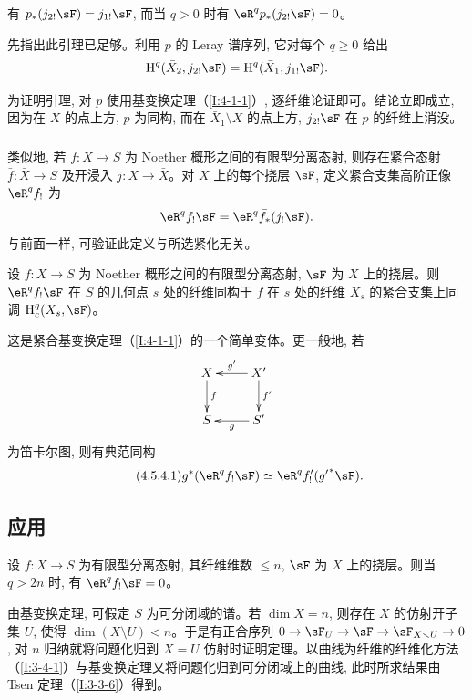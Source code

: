 \begin{lemma}\label{I:4-5-2}
有 $p_*(j_{2!}\sF)=j_{1!}\sF$, 而当 $q>0$ 时有 $\eR^qp_*(j_{2!}\sF)=0$。
\end{lemma}

先指出此引理已足够。利用 $p$ 的 Leray 谱序列, 它对每个 $q\geqslant0$ 给出
\[
  \h^q(\bar X_2, j_{2!} \sF) = \h^q(\bar X_1, j_{1!} \sF) \text{.}
\]

为证明引理, 对 $p$ 使用基变换定理（\ref{I:4-1-1}）, 逐纤维论证即可。结论立即成立, 因为在 $X$ 的点上方, $p$ 为同构, 而在 $\bar X_1\setminus X$ 的点上方, $j_{2!}\sF$ 在 $p$ 的纤维上消没。

\subsubsection{}\label{I:4-5-3}

类似地, 若 $f:X\to S$ 为 Noether 概形之间的有限型分离态射, 则存在紧合态射 $\bar f:\bar X\to S$ 及开浸入 $j:X\to\bar X$。对 $X$ 上的每个挠层 $\sF$, 定义紧合支集高阶正像 $\eR^qf_!$ 为
\[
  \eR^q f_! \sF = \eR^q \bar f_*(j_! \sF) \text{.}
\]
与前面一样, 可验证此定义与所选紧化无关。

\begin{theorem}\label{I:4-5-4}
设 $f:X\to S$ 为 Noether 概形之间的有限型分离态射, $\sF$ 为 $X$ 上的挠层。则 $\eR^qf_!\sF$ 在 $S$ 的几何点 $s$ 处的纤维同构于 $f$ 在 $s$ 处的纤维 $X_s$ 的紧合支集上同调 $\h_c^q(X_s,\sF)$。
\end{theorem}

这是紧合基变换定理（\ref{I:4-1-1}）的一个简单变体。更一般地, 若
\[\xymatrix{
  X \ar[d]^-f
    & X' \ar[l]_-{g'} \ar[d]^-{f'} \\
  S
    & S' \ar[l]^-g
}\]
为笛卡尔图, 则有典范同构
\begin{equation*}\tag{4.5.4.1}\label{I:eq:4-5-4-1}
  g^* (\eR^q f_! \sF) \simeq \eR^q f'_!({g'}^* \sF) \text{.}
\end{equation*}

\subsection{应用}\label{I:4-6}

\begin{theorem}[消没定理]\label{I:4-6-1}
设 $f:X\to S$ 为有限型分离态射, 其纤维维数 $\leqslant n$, $\sF$ 为 $X$ 上的挠层。则当 $q>2n$ 时, 有 $\eR^qf_!\sF=0$。
\end{theorem}

由基变换定理, 可假定 $S$ 为可分闭域的谱。若 $\dim X=n$, 则存在 $X$ 的仿射开子集 $U$, 使得 $\dim(X\setminus U)<n$。于是有正合序列 $0\to\sF_U\to\sF\to\sF_{X\setminus U}\to0$, 对 $n$ 归纳就将问题化归到 $X=U$ 仿射时证明定理。以曲线为纤维的纤维化方法（\ref{I:3-4-1}）与基变换定理又将问题化归到可分闭域上的曲线, 此时所求结果由 Tsen 定理（\ref{I:3-3-6}）得到。

